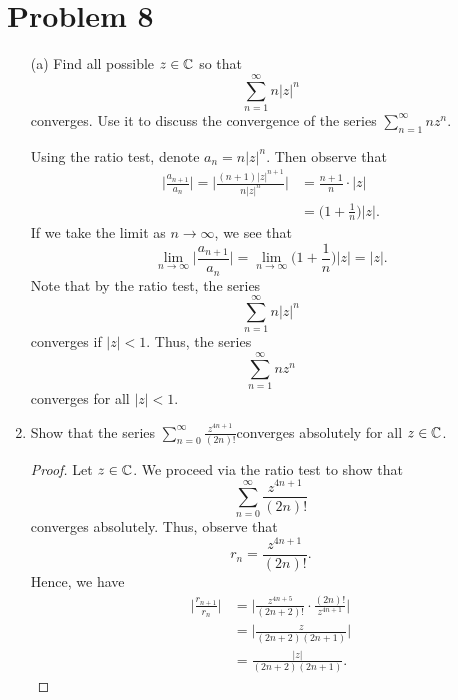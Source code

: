 \documentclass[a4paper]{article}
\begin{document}
\section*{Problem 8}
\begin{enumerate}
    \item[(a)] Find all possible \( z \in \mathbb{C}  \) so that 
        \[  \sum_{ n=1  }^{ \infty  } n | z |^{n}  \] 
        converges. Use it to discuss the convergence of the series \( \sum_{ n=1  }^{  \infty  } n z^{n} \).
        \begin{solution}
        Using the ratio test, denote \( {a}_{n} = n | z |^{n} \). Then observe that         
        \begin{align*}
            \Big| \frac{ {a}_{n+1} }{ {a}_{n} }  \Big|  = \Big| \frac{ (n+1) | z |^{n+1} }{ n | z |^{n} }  \Big| &= \frac{ n+1 }{ n } \cdot | z |  \\
                                                                                                                 &= \Big(  1 + \frac{ 1 }{ n }  \Big) | z |. 
        \end{align*}
        If we take the limit as \( n \to \infty  \), we see that 
        \[  \lim_{ n \to \infty  }  \Big| \frac{ {a}_{n+1} }{ {a}_{n} }  \Big| = \lim_{ n \to \infty  } \Big( 1 + \frac{ 1 }{ n }  \Big) | z | = | z |. \]
        Note that by the ratio test, the series 
        \[  \sum_{ n=1 }^{ \infty  }n | z |^{n} \]
        converges if \( | z |  < 1  \). Thus, the series  
        \[  \sum_{ n=1 }^{ \infty  } n z^{n} \] converges for all 
        \( | z | < 1  \).
        \end{solution}
    \item Show that the series \( \sum_{ n=0 }^{ \infty  } \frac{ z^{4n+1} }{ (2n)! }  \)converges absolutely for all \( z \in \mathbb{C}  \).
        \begin{proof}
        Let \( z \in \mathbb{C}  \). We proceed via the ratio test to show that 
        \[  \sum_{ n=0  }^{  \infty  } \frac{ z^{4n+1} }{ (2n)! }  \]
        converges absolutely. Thus, observe that
        \[  {r}_{n} = \frac{ z^{4n+1} }{ (2n)! }. \]
        Hence, we have
        \begin{align*}
            \Big| \frac{ {r}_{n+1} }{ {r}_{n} }  \Big| &= \Big| \frac{ z^{4n+5} }{ (2n+2)! } \cdot \frac{ (2n)! }{ z^{4n+1} }   \Big|  \\
                                                       &= \Big| \frac{ z }{ (2n+2)(2n+1) }  \Big| \\
                                                       &= \frac{ | z |  }{ (2n+2)(2n+1) } .

\end{align*}
\end{proof}
\end{enumerate}
\end{document}
